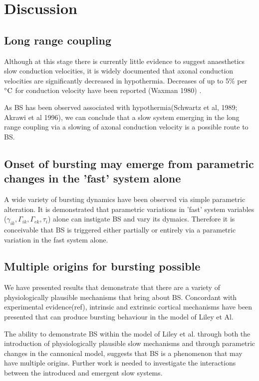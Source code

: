 \documentclass[a4paper,12pt]{article}
\begin{document}
\section{Discussion}

\subsection{Long range coupling}
Although at this stage there is currently little evidence to suggest anaesthetics slow conduction velocities, it is
widely documented that axonal conduction velocities are significantly decreased in hypothermia. Decreases of up to 5\%
per $^{\circ}{\rm C}$ for conduction velocity have been reported (Waxman 1980) .

As BS has been observed associated with hypothermia(Schwartz et al, 1989; Akrawi et al 1996), we can conclude that  a slow system emerging in the long range coupling via a slowing of axonal conduction velocity is a possible route
to BS.

\subsection{Onset of bursting may emerge from parametric changes in the 'fast' system alone}
A wide variety of bursting dynamics have been observed via simple parametric alteration. It is demonstrated that parametric variations in
'fast' system variables ($\gamma_{ik}, \Gamma_{ik}, \Gamma_{ek}, \tau_i$) alone can instigate BS and vary its dymaics. Therefore it is conceivable that BS is triggered either partially or entirely via a parametric variation in the fast system alone.

\subsection{Multiple origins for bursting possible}
We have presented results that demonstrate that there are a variety of physiologically plausible mechanisms that bring about
BS. Concordant with experimental evidence(ref), intrinsic and extrinsic cortical mechanisms have been
presented that can produce bursting behaviour in the model of Liley et Al.

The ability to demonstrate BS within the model of Liley et al. through both the introduction of physiologically
plausible slow mechanisms and through parametric changes in the cannonical model, suggests that BS is a phenomenon that may have multiple origins. Further work is needed to investigate the interactions
between the introduced and emergent slow systems.
\end{document}
